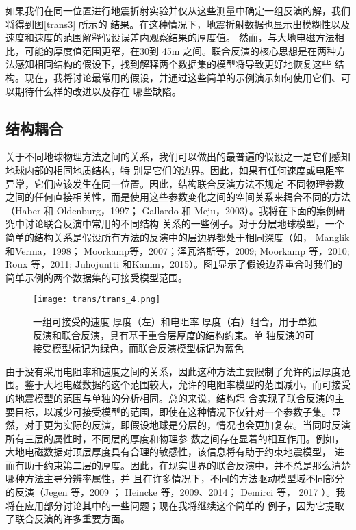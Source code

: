 如果我们在同一位置进行地震折射实验并仅从这些测量中确定一组反演的解，我们将得到图\ref{trans3} 所示的 结果。在这种情况下，地震折射数据也显示出模糊性以及速度和速度的范围解释假设误差内观察结果的厚度值。 然而，与大地电磁方法相比，可能的厚度值范围更窄，在30到 45m 之间。联合反演的核心思想是在两种方法感知相同结构的假设下，找到解释两个数据集的模型将导致更好地恢复这些 结构。现在，我将讨论最常用的假设，并通过这些简单的示例演示如何使用它们、可以期待什么样的改进以及存在 哪些缺陷。


\subsection{结构耦合}

关于不同地球物理方法之间的关系，我们可以做出的最普遍的假设之一是它们感知地球内部的相同地质结构，特 别是它们的边界。因此，如果有任何速度或电阻率异常，它们应该发生在同一位置。因此，结构联合反演方法不规定 不同物理参数之间的任何直接相关性，而是使用这些参数变化之间的空间关系来耦合不同的方法（Haber 和 Oldenburg，1997； Gallardo 和 Meju，2003）。我将在下面的案例研究中讨论联合反演中常用的不同结构 关系的一些例子。对于分层地球模型，一个简单的结构关系是假设所有方法的反演中的层边界都处于相同深度（如， Manglik 和Verma，1998； Moorkamp等，2007；泽瓦洛斯等，2009; Moorkamp 等，2010; Roux 等，2011; Juhojuntti 和Kamm，2015）。图\ref{trans4}显示了假设边界重合时我们的简单示例的两个数据集的可接受模型范围。

\begin{figure}
    \centering
    \texttt{[image: trans/trans\_4.png]}
    \setcounter{figure}{3}
    \caption{一组可接受的速度-厚度（左）和电阻率-厚度（右）组合，用于单独反演和联合反演，具有基于重合层厚度的结构约束。单 独反演的可接受模型标记为绿色，而联合反演模型标记为蓝色}\label{trans4}

\end{figure}

由于没有采用电阻率和速度之间的关系，因此这种方法主要限制了允许的层厚度范围。鉴于大地电磁数据的这个范围较大，允许的电阻率模型的范围减小，而可接受的地震模型的范围与单独的分析相同。总的来说，结构耦 合实现了联合反演的主要目标，以减少可接受模型的范围，即使在这种情况下仅针对一个参数子集。显然，对于更为实际的反演，即假设地球是分层的，情况也会更加复杂。当同时反演所有三层的属性时，不同层的厚度和物理参 数之间存在显着的相互作用。例如，大地电磁数据对顶层厚度具有合理的敏感性，该信息将有助于约束地震模型， 进而有助于约束第二层的厚度。因此，在现实世界的联合反演中，并不总是那么清楚哪种方法主导分辨率属性，并 且在许多情况下，不同的方法驱动模型域不同部分的反演（Jegen 等，2009 ； Heincke 等，2009、2014； Demirci 等， 2017 ）。我将在应用部分讨论其中的一些问题；现在我将继续这个简单的 例子，因为它提取了联合反演的许多重要方面。


